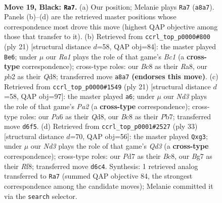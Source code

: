 \documentclass[11pt]{article}
\begin{document}
\clearpage

\begin{figure}[p]\centering
\begin{subfigure}{0.46\textwidth}\centering
\resizebox{\linewidth}{!}{%
\newchessgame
\chessboard[
  setfen={r1bq1r1k/1p1pppbp/p2n4/3Q4/2P5/2NP1N1B/PP3P1P/R1B2RK1 b - - 2 19},
  showmover=false,
  pgfstyle=straightmove, color=movearrow, markmove={a8-a7}
]}
\caption{}
\end{subfigure}\hfill
\begin{subfigure}{0.46\textwidth}\centering
\resizebox{\linewidth}{!}{%
\newchessgame
\chessboard[
  setfen={r1bq1rk1/ppp1bppp/3p1n2/8/P2QPB2/2N5/BPP2PPP/R4RK1 b - - 0 11},
  showmover=false,
  pgfstyle=straightmove, color=movearrow, markmove={c8-e6}
]}
\caption{}
\end{subfigure}
\\[4pt]
\begin{subfigure}{0.46\textwidth}\centering
\resizebox{\linewidth}{!}{%
\newchessgame
\chessboard[
  setfen={r2q1rk1/pp1bbppp/3ppn2/6B1/3QP2P/2N5/PPP2PP1/1K1R1B1R b - - 2 11},
  showmover=false,
  pgfstyle=straightmove, color=movearrow, markmove={a7-a6}
]}
\caption{}
\end{subfigure}\hfill
\begin{subfigure}{0.46\textwidth}\centering
\resizebox{\linewidth}{!}{%
\newchessgame
\chessboard[
  setfen={r1b2rk1/2p3pp/2pqnb2/3p1B2/p7/4BNQ1/PPP2PPP/1R2R1K1 b - - 3 17},
  showmover=false,
  pgfstyle=straightmove, color=movearrow, markmove={d6-g3}
]}
\caption{}
\end{subfigure}
\caption{\textbf{Move 19, Black: \texttt{Ra7}.} (a) Our position; Melanie plays \texttt{Ra7} (\texttt{a8a7}). Panels (b)--(d) are the retrieved master positions whose correspondence most drove this move (highest QAP objective among those that transfer to it). (b) Retrieved from \texttt{ccrl\_top\_p0000\#800} (ply 21) [structural distance $d$=58, QAP obj=84]: the master played \texttt{Be6}; under $\mu$ our \emph{Ra1} plays the role of that game's \emph{Bc1} (a \textbf{cross-type} correspondence); cross-type roles: our \emph{B}c8 as their \emph{R}a8, our \emph{p}b2 as their \emph{Q}d8; transferred move \texttt{a8a7} \textbf{(endorses this move)}. (c) Retrieved from \texttt{ccrl\_top\_p0000\#1549} (ply 21) [structural distance $d$=58, QAP obj=97]: the master played \texttt{a6}; under $\mu$ our \emph{Nd3} plays the role of that game's \emph{Pa2} (a \textbf{cross-type} correspondence); cross-type roles: our \emph{P}a6 as their \emph{Q}d8, our \emph{B}c8 as their \emph{P}b7; transferred move \texttt{d6f5}. (d) Retrieved from \texttt{ccrl\_top\_p0001\#2527} (ply 33) [structural distance $d$=70, QAP obj=56]: the master played \texttt{Qxg3}; under $\mu$ our \emph{Nd3} plays the role of that game's \emph{Qd3} (a \textbf{cross-type} correspondence); cross-type roles: our \emph{P}d7 as their \emph{B}c8, our \emph{B}g7 as their \emph{R}f8; transferred move \texttt{d6c4}. Synthesis: 1 retrieved analog transferred to \texttt{Ra7} (summed QAP objective 84, the strongest correspondence among the candidate moves); Melanie committed it via the \texttt{search} selector.}
\label{fig:thought-m37}
\end{figure}
\end{document}
